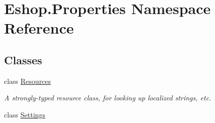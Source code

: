 \hypertarget{namespace_eshop_1_1_properties}{}\section{Eshop.\+Properties Namespace Reference}
\label{namespace_eshop_1_1_properties}
\subsection*{Classes}
\begin{DoxyCompactItemize}
\item 
class \mbox{\hyperlink{class_eshop_1_1_properties_1_1_resources}{Resources}}
\begin{DoxyCompactList}\small\item\em A strongly-\/typed resource class, for looking up localized strings, etc. \end{DoxyCompactList}\item 
class \mbox{\hyperlink{class_eshop_1_1_properties_1_1_settings}{Settings}}
\end{DoxyCompactItemize}
